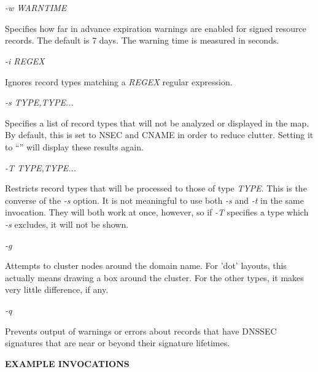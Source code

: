 \begin{description}
\item {\it -w WARNTIME}\verb" "

Specifies how far in advance expiration warnings are enabled for signed
resource records.  The default is 7 days.  The warning time is measured
in seconds.

\item {\it -i REGEX}\verb" "

Ignores record types matching a {\it REGEX} regular expression.

\item {\it -s TYPE,TYPE...}\verb" "

Specifies a list of record types that will not be analyzed or displayed
in the map.  By default, this is set to NSEC and CNAME in order to reduce
clutter.  Setting it to ``'' will display these results again.

\item {\it -T TYPE,TYPE...}\verb" "

Restricts record types that will be processed to those of type {\it TYPE}.
This is the converse of the {\it -s} option.  It is not meaningful to use both
{\it -s} and {\it -t} in the same invocation.  They will both work at once,
however, so if {\it -T} specifies a type which {\it -s} excludes, it will not
be shown.

\item {\it -g}\verb" "

Attempts to cluster nodes around the domain name.  For 'dot' layouts,
this actually means drawing a box around the cluster.  For the other
types, it makes very little difference, if any.

\item {\it -q}\verb" "

Prevents output of warnings or errors about records that have DNSSEC
signatures that are near or beyond their signature lifetimes.

\end{description}

{\bf EXAMPLE INVOCATIONS}

